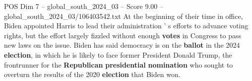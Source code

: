 \begin{textsample}{POS Dim 7 – global\_south\_2024\_03 – Score 9.00 – global\_south\_2024\_03/106403542.txt}
At the beginning of their time in office, Biden appointed Harris to lead their administration ' s efforts to advance voting rights, but the effort largely fizzled without enough \textbf{votes} in Congress to pass new laws on the issue.
Biden has said democracy is on the \textbf{ballot} in the 2024 \textbf{election}, in which he is likely to face former President Donald Trump, the frontrunner for the \textbf{Republican} \textbf{presidential} \textbf{nomination} who sought to overturn the results of the 2020 \textbf{election} that Biden won.

\end{textsample}
